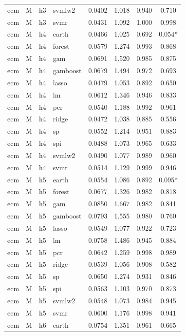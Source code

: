 \begin{ThreePartTable}
\begin{longtable}[t]{llclcccc}
ecm & M & h3 & svmlw2 & 0.0402 & 1.018 & 0.940 & 0.710\\
ecm & M & h3 & svmr & 0.0431 & 1.092 & 1.000 & 0.998\\
\addlinespace
ecm & M & h4 & earth & 0.0466 & 1.025 & 0.692 & 0.054*\\
ecm & M & h4 & forest & 0.0579 & 1.274 & 0.993 & 0.868\\
ecm & M & h4 & gam & 0.0691 & 1.520 & 0.985 & 0.875\\
ecm & M & h4 & gamboost & 0.0679 & 1.494 & 0.972 & 0.693\\
ecm & M & h4 & lasso & 0.0479 & 1.053 & 0.892 & 0.650\\
ecm & M & h4 & lm & 0.0612 & 1.346 & 0.946 & 0.833\\
ecm & M & h4 & pcr & 0.0540 & 1.188 & 0.992 & 0.961\\
ecm & M & h4 & ridge & 0.0472 & 1.038 & 0.885 & 0.556\\
ecm & M & h4 & sp & 0.0552 & 1.214 & 0.951 & 0.883\\
ecm & M & h4 & spi & 0.0488 & 1.073 & 0.965 & 0.633\\
ecm & M & h4 & svmlw2 & 0.0490 & 1.077 & 0.989 & 0.960\\
ecm & M & h4 & svmr & 0.0514 & 1.129 & 0.999 & 0.946\\
\addlinespace
ecm & M & h5 & earth & 0.0554 & 1.086 & 0.892 & 0.095*\\
ecm & M & h5 & forest & 0.0677 & 1.326 & 0.982 & 0.818\\
ecm & M & h5 & gam & 0.0850 & 1.667 & 0.982 & 0.841\\
ecm & M & h5 & gamboost & 0.0793 & 1.555 & 0.980 & 0.760\\
ecm & M & h5 & lasso & 0.0549 & 1.077 & 0.922 & 0.723\\
ecm & M & h5 & lm & 0.0758 & 1.486 & 0.945 & 0.884\\
ecm & M & h5 & pcr & 0.0642 & 1.259 & 0.998 & 0.989\\
ecm & M & h5 & ridge & 0.0539 & 1.056 & 0.908 & 0.582\\
ecm & M & h5 & sp & 0.0650 & 1.274 & 0.931 & 0.846\\
ecm & M & h5 & spi & 0.0563 & 1.103 & 0.970 & 0.873\\
ecm & M & h5 & svmlw2 & 0.0548 & 1.073 & 0.984 & 0.945\\
ecm & M & h5 & svmr & 0.0600 & 1.176 & 0.998 & 0.941\\
\addlinespace
ecm & M & h6 & earth & 0.0754 & 1.351 & 0.961 & 0.665\\

\end{longtable}
\end{ThreePartTable}
